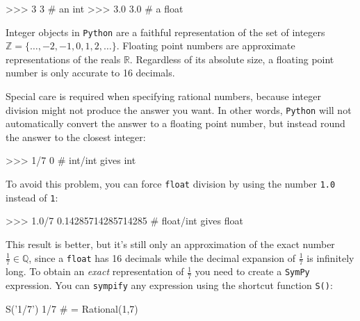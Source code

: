 \small
\begin{verbatimtab}
>>> 3
3                             # an int
>>> 3.0
3.0                           # a float 
\end{verbatimtab}
\normalsize
Integer objects in \texttt{Python} are a faithful representation of the set of integers $\mathbb{Z}=\{\ldots,-2,-1,0,1,2,\ldots\}$.
Floating point numbers are approximate representations of the reals $\mathbb{R}$.
Regardless of its absolute size, 
a floating point number is only accurate to 16 decimals.



 
Special care is required when specifying rational numbers,
because integer division might not produce the answer you want.
In other words, 
\texttt{Python} will not automatically convert the answer to a floating point number,
but instead round the answer to the closest integer:
\small
\begin{verbatimtab}
>>> 1/7
0                             # int/int gives int 
\end{verbatimtab}
\normalsize

\noindent
To avoid this problem, you can force \texttt{float} division by using the number \texttt{1.0} instead of \texttt{1}:
\small
\begin{verbatimtab}
>>> 1.0/7
0.14285714285714285           # float/int gives float
\end{verbatimtab}
\normalsize

\noindent
This result is better, but it's still only an approximation of the exact number $\frac{1}{7} \in \mathbb{Q}$, 
since a \texttt{float} has 16 decimals while the decimal expansion of $\frac{1}{7}$ is infinitely long. 
To obtain an \emph{exact} representation of $\frac{1}{7}$ you need to create a \texttt{SymPy} expression.
You can \texttt{sympify} any expression using the shortcut function \texttt{S()}:
\small
\begin{verbatimtab}
S('1/7')
1/7                           # = Rational(1,7)
\end{verbatimtab}
\normalsize

